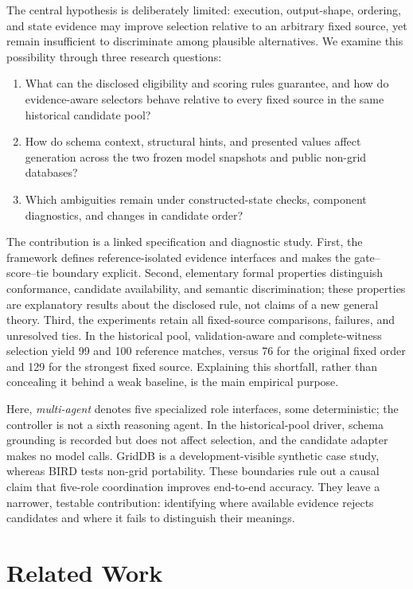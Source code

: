\documentclass[information,article,submit,moreauthors]{Definitions/mdpi}
\begin{document}
The central hypothesis is deliberately limited: execution, output-shape, ordering, and state evidence may improve selection relative to an arbitrary fixed source, yet remain insufficient to discriminate among plausible alternatives. We examine this possibility through three research questions:
\begin{enumerate}
\item What can the disclosed eligibility and scoring rules guarantee, and how do evidence-aware selectors behave relative to every fixed source in the same historical candidate pool?
\item How do schema context, structural hints, and presented values affect generation across the two frozen model snapshots and public non-grid databases?
\item Which ambiguities remain under constructed-state checks, component diagnostics, and changes in candidate order?
\end{enumerate}

The contribution is a linked specification and diagnostic study. First, the framework defines reference-isolated evidence interfaces and makes the gate--score--tie boundary explicit. Second, elementary formal properties distinguish conformance, candidate availability, and semantic discrimination; these properties are explanatory results about the disclosed rule, not claims of a new general theory. Third, the experiments retain all fixed-source comparisons, failures, and unresolved ties. In the historical pool, validation-aware and complete-witness selection yield 99 and 100 reference matches, versus 76 for the original fixed order and 129 for the strongest fixed source. Explaining this shortfall, rather than concealing it behind a weak baseline, is the main empirical purpose.

Here, \emph{multi-agent} denotes five specialized role interfaces, some deterministic; the controller is not a sixth reasoning agent. In the historical-pool driver, schema grounding is recorded but does not affect selection, and the candidate adapter makes no model calls. GridDB is a development-visible synthetic case study, whereas BIRD tests non-grid portability. These boundaries rule out a causal claim that five-role coordination improves end-to-end accuracy. They leave a narrower, testable contribution: identifying where available evidence rejects candidates and where it fails to distinguish their meanings.

\section{Related Work}
\end{document}
